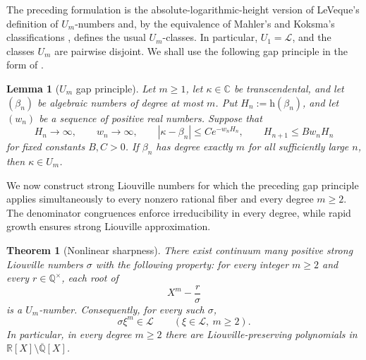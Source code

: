 \documentclass[11pt]{amsart}
\numberwithin{equation}{section}
\newtheorem{theorem}{Theorem}[section]
\newtheorem{lemma}[lemma]{Lemma}
\theoremstyle{definition}
\theoremstyle{remark}
\newcommand{\R}{\mathbb R}
\newcommand{\Q}{\mathbb Q}
\newcommand{\C}{\mathbb C}
\newcommand{\Lio}{\mathscr L}
\begin{document}
The preceding formulation is the absolute-logarithmic-height version
of LeVeque's definition of $U_m$-numbers
\cite[Remark~2.6]{BiluMarquesMoreira2026} and, by the equivalence of
Mahler's and Koksma's classifications
\cite[Theorem~3.6]{Bugeaud2004}, defines the usual $U_m$-classes. In
particular, $U_1=\Lio$, and the classes $U_m$ are pairwise disjoint. We shall use the following gap principle in the form of
\cite[Theorem~3.1 and Corollary~3.3]{BiluMarques2026}.

\begin{lemma}[$U_m$ gap principle]
\label{lem:Um-gap-principle}
Let \(m\geq1\), let \(\kappa\in\C\) be transcendental, and let
\((\beta_n)\) be algebraic numbers of degree at most \(m\). Put
\(H_n:=\mathrm h(\beta_n)\), and let \((w_n)\) be a sequence of
positive real numbers. Suppose that
\[
H_n\to\infty,
\qquad
w_n\to\infty,
\qquad
|\kappa-\beta_n|\leq Ce^{-w_nH_n},
\qquad
H_{n+1}\leq Bw_nH_n
\]
for fixed constants \(B,C>0\). If \(\beta_n\) has degree exactly
\(m\) for all sufficiently large \(n\), then \(\kappa\in U_m\).
\end{lemma}

We now construct strong Liouville numbers for which the preceding gap
principle applies simultaneously to every nonzero rational fiber and
every degree \(m\geq2\). The denominator congruences enforce
irreducibility in every degree, while rapid growth ensures strong
Liouville approximation.

\begin{theorem}[Nonlinear sharpness]
\label{thm:strong-nonlinear-preservers}
There exist continuum many positive strong Liouville numbers \(\sigma\)
with the following property: for every integer \(m\geq2\) and every
\(r\in\Q^\times\), each root of
\begin{equation}\label{eq:nonlinear-fiber-equation}
X^m-\frac r\sigma
\end{equation}
is a \(U_m\)-number. Consequently, for every such \(\sigma\),
\begin{equation}\label{eq:nonlinear-preservation}
\sigma\xi^m\in\Lio
\qquad(\xi\in\Lio,\ m\geq2).
\end{equation}
In particular, in every degree \(m\geq2\) there are
Liouville-preserving polynomials in
\(\R[X]\setminus\overline{\Q}[X]\).
\end{theorem}
\end{document}
